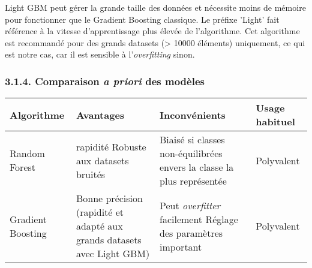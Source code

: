 \documentclass[11pt]{article}
\begin{document}
Light GBM peut gérer la grande taille des données et nécessite moins de
mémoire pour fonctionner que le Gradient Boosting classique. Le préfixe
'Light' fait référence à la vitesse d'apprentissage plus élevée de
l'algorithme. Cet algorithme est recommandé pour des grands datasets
(\textgreater{} 10000 éléments) uniquement, ce qui est notre cas, car il
est sensible à l'\emph{overfitting} sinon.

    \subsubsection{\texorpdfstring{3.1.4. Comparaison \emph{a priori} des
modèles}{3.1.4. Comparaison a priori des modèles}}\label{comparaison-a-priori-des-moduxe8les}

\begin{longtable}[]{@{}llll@{}}
\toprule
\begin{minipage}[b]{0.32\columnwidth}\raggedright\strut
Algorithme\strut
\end{minipage} & \begin{minipage}[b]{0.17\columnwidth}\raggedright\strut
Avantages\strut
\end{minipage} & \begin{minipage}[b]{0.20\columnwidth}\raggedright\strut
Inconvénients\strut
\end{minipage} & \begin{minipage}[b]{0.20\columnwidth}\raggedright\strut
Usage habituel\strut
\end{minipage}\tabularnewline
\midrule
\endhead
\begin{minipage}[t]{0.32\columnwidth}\raggedright\strut
Random Forest\strut
\end{minipage} & \begin{minipage}[t]{0.17\columnwidth}\raggedright\strut
rapidité Robuste aux datasets bruités\strut
\end{minipage} & \begin{minipage}[t]{0.20\columnwidth}\raggedright\strut
Biaisé si classes non-équilibrées envers la classe la plus
représentée\strut
\end{minipage} & \begin{minipage}[t]{0.20\columnwidth}\raggedright\strut
Polyvalent\strut
\end{minipage}\tabularnewline
\begin{minipage}[t]{0.32\columnwidth}\raggedright\strut
Gradient Boosting\strut
\end{minipage} & \begin{minipage}[t]{0.17\columnwidth}\raggedright\strut
Bonne précision (rapidité et adapté aux grands datasets avec Light
GBM)\strut
\end{minipage} & \begin{minipage}[t]{0.20\columnwidth}\raggedright\strut
Peut \emph{overfitter} facilement Réglage des paramètres important\strut
\end{minipage} & \begin{minipage}[t]{0.20\columnwidth}\raggedright\strut
Polyvalent\strut
\end{minipage}\tabularnewline
\bottomrule
\end{longtable}
\end{document}
